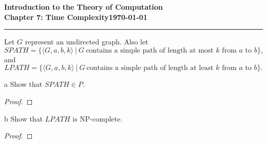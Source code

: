 \documentclass[11pt]{article}
\newcommand{\dated}{\today}
\begin{document}
\textbf{Introduction to the Theory of
Computation}\hfill\textbf{\myname}\\[0.01in]
\textbf{Chapter 7: Time Complexity}\hfill\textbf{\dated}\\
\smallskip\hrule\bigskip

\begin{problem}{7.21}
Let $G$ represent an undirected graph. Also let
\[
SPATH = \{\langle G, a, b, k \rangle \ | \ G \ \text{contains a simple path of length at most } k \text{ from } a \text{ to } b\},
\]
and
\[
LPATH = \{\langle G, a, b, k \rangle \ | \ G \ \text{contains a simple path of length at least } k \text{ from } a \text{ to } b\}.
\]
\end{problem}

\begin{problem}[Part]{a}
Show that $SPATH \in P$.
\end{problem}

\begin{proof}
\end{proof}

\begin{problem}[Part]{b}
Show that $LPATH$ is NP-complete.
\end{problem}

\begin{proof}
\end{proof}
\end{document}
